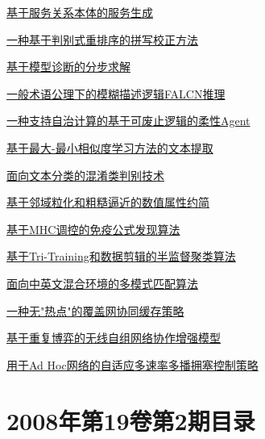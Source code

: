 \documentclass[a4paper]{article}
\begin{document}
\href{http://www.jos.org.cn/ch/reader/download_pdf.aspx?file_no=20080307&year_id=2008&quarter_id=3&falg=1}{基于服务关系本体的服务生成}

\href{http://www.jos.org.cn/ch/reader/download_pdf.aspx?file_no=20080308&year_id=2008&quarter_id=3&falg=1}{一种基于判别式重排序的拼写校正方法}

\href{http://www.jos.org.cn/ch/reader/download_pdf.aspx?file_no=20080310&year_id=2008&quarter_id=3&falg=1}{基于模型诊断的分步求解}

\href{http://www.jos.org.cn/ch/reader/download_pdf.aspx?file_no=20080311&year_id=2008&quarter_id=3&falg=1}{一般术语公理下的模糊描述逻辑FALCN推理}

\href{http://www.jos.org.cn/ch/reader/download_pdf.aspx?file_no=20080312&year_id=2008&quarter_id=3&falg=1}{一种支持自治计算的基于可废止逻辑的柔性Agent}

\href{http://www.jos.org.cn/ch/reader/download_pdf.aspx?file_no=20080313&year_id=2008&quarter_id=3&falg=1}{基于最大-最小相似度学习方法的文本提取}

\href{http://www.jos.org.cn/ch/reader/download_pdf.aspx?file_no=20080314&year_id=2008&quarter_id=3&falg=1}{面向文本分类的混淆类判别技术}

\href{http://www.jos.org.cn/ch/reader/download_pdf.aspx?file_no=20080315&year_id=2008&quarter_id=3&falg=1}{基于邻域粒化和粗糙逼近的数值属性约简}

\href{http://www.jos.org.cn/ch/reader/download_pdf.aspx?file_no=20080316&year_id=2008&quarter_id=3&falg=1}{基于MHC调控的免疫公式发现算法}

\href{http://www.jos.org.cn/ch/reader/download_pdf.aspx?file_no=20080317&year_id=2008&quarter_id=3&falg=1}{基于Tri-Training和数据剪辑的半监督聚类算法}

\href{http://www.jos.org.cn/ch/reader/download_pdf.aspx?file_no=20080318&year_id=2008&quarter_id=3&falg=1}{面向中英文混合环境的多模式匹配算法}

\href{http://www.jos.org.cn/ch/reader/download_pdf.aspx?file_no=20080323&year_id=2008&quarter_id=3&falg=1}{一种无"热点"的覆盖网协同缓存策略}

\href{http://www.jos.org.cn/ch/reader/download_pdf.aspx?file_no=20080324&year_id=2008&quarter_id=3&falg=1}{基于重复博弈的无线自组网络协作增强模型}

\href{http://www.jos.org.cn/ch/reader/download_pdf.aspx?file_no=20080325&year_id=2008&quarter_id=3&falg=1}{用于Ad Hoc网络的自适应多速率多播拥塞控制策略}


\section{\textbf{2008年第19卷第2期目录}}
\end{document}
